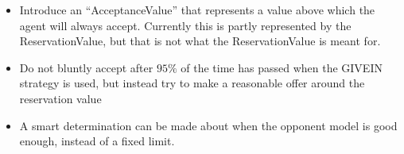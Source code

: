 \begin{itemize}
\item Introduce an ``AcceptanceValue'' that represents a value above which the agent will always accept. Currently this is partly represented by the ReservationValue, but that is not what the ReservationValue is meant for.
\item Do not bluntly accept after $95\%$ of the time has passed when the GIVEIN strategy is used, but instead try to make a reasonable offer around the reservation value
\item A smart determination can be made about when the opponent model is good enough, instead of a fixed limit.
\end{itemize}
